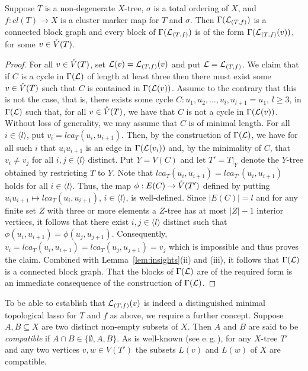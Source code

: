 \begin{pro}
  \label{prop:block}
  Suppose $T$ is a non-degenerate $X$-tree, $\sigma$ is a total ordering of
  $X$, and $f:cl(T)\to X$ is a cluster marker map for $T$ and $\sigma$. Then
  $\Gamma({\mathcal L}_{(T,f)})$ is a connected block graph and every block of
  $\Gamma({\mathcal L}_{(T,f)})$ is of the form $\Gamma({\mathcal L}_{(T,f)}(v))$, for some
  $v\in \mathring{V}(T)$.
\end{pro}
\begin{proof}
  For all $v\in \mathring{V}(T)$, set ${\mathcal L}(v)={\mathcal L}_{(T,f)}(v)$ and put
  ${\mathcal L}={\mathcal L}_{(T,f)}$.  We claim that if $C$ is a cycle in $\Gamma({\mathcal L})$ of
  length at least three then there must exist some $v\in \mathring{V}(T)$ such that $C$
  is contained in $\Gamma({\mathcal L}(v))$. Assume to the contrary that this is not
  the case, that is, there exists some cycle $C:u_1,u_2,\ldots,
  u_l,u_{l+1}=u_1$, $l\geq 3$, in $\Gamma({\mathcal L})$ such that, for all $v\in
  \mathring{V}(T)$, we have that $C$ is not a cycle in $\Gamma({\mathcal L}(v))$. Without loss
  of generality, we may assume that $C$ is of minimal length. For all
  $i\in\langle l\rangle$, put $v_i=lca_T(u_i,u_{i+1})$. Then, by the
  construction of $\Gamma({\mathcal L})$, we have for all such $i$ that $u_iu_{i+1}$ is
  an edge in $\Gamma({\mathcal L}(v_i))$ and, by the minimality of $C$, that
  $v_i\not=v_j$ for all $i,j\in\langle l\rangle$ distinct. Put $Y=V(C)$ and
  let $T'=T|_Y$ denote the $Y$-tree obtained by restricting $T$ to $Y$. Note
  that $lca_T(u_i,u_{i+1})=lca_{T'}(u_i,u_{i+1})$ holds for all $i\in\langle
  l\rangle$.  Thus, the map $\phi:E(C)\to \mathring{V}(T')$ defined by putting
  $u_iu_{i+1}\mapsto lca_{T}(u_i,u_{i+1})$, $i\in\langle l \rangle$, is
  well-defined.  Since $|E(C)|=l$ and for any finite set $Z$ with three or
  more elements a $Z$-tree has at most $|Z|-1$ interior vertices, it follows
  that there exist $i,j\in \langle l \rangle$ distinct such that
  $\phi(u_i,u_{i+1})=\phi(u_j,u_{j+1})$. Consequently,
  $v_i=lca_T(u_i,u_{i+1})=lca_T(u_j,u_{j+1})=v_j$ which is impossible and thus
  proves the claim.  Combined with Lemma~\ref{lem:insights}(ii) and (iii), it
  follows that $\Gamma({\mathcal L})$ is a connected block graph. That the blocks of
  $\Gamma({\mathcal L})$ are of the required form is an immediate consequence of the
  construction of $\Gamma({\mathcal L})$.
\end{proof}


To be able to establish that ${\mathcal L}_{(T,f)}(v)$ is indeed a distinguished
minimal topological lasso for $T$ and $f$ as above, we require a further
concept. Suppose $A, B\subseteq X$ are two distinct non-empty subsets of
$X$. Then $A$ and $B$ are said to be {\em compatible} if $A\cap
B\in\{\emptyset, A,B\}$. As is well-known (see
e.\,g.\,\cite{DHKMS11,semple2003phylogenetics}), for any $X$-tree $T'$ and any
two vertices $v,w\in V(T')$ the subsets $L(v)$ and $L(w)$ of $X$ are
compatible.

